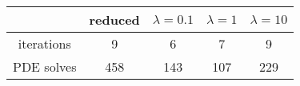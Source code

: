 \begin{tabular}{ccccc}
& reduced & $\lambda = 0.1$ & $\lambda = 1$ & $\lambda = 10$ \\
\hline
iterations & 9 & 6 & 7 & 9 \\
PDE solves & 458 & 143 & 107 & 229 \\
\hline
\end{tabular}
